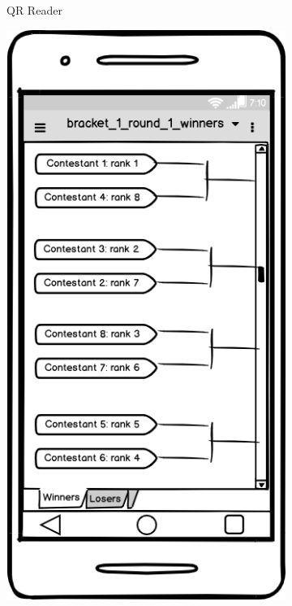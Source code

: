 \documentclass{article}
\begin{document}
\begin{figure}[!htb]
\begin{subfigure}{0.3\textwidth}
        \caption{QR Reader} \label{fig:x_b}
    \end{subfigure}
    \hspace*{\fill}
    \begin{subfigure}{0.3\textwidth}
        \includegraphics[width=\linewidth]{figs/bracket_1_round_1_winners.png}

\end{subfigure}
\end{figure}
\end{document}
